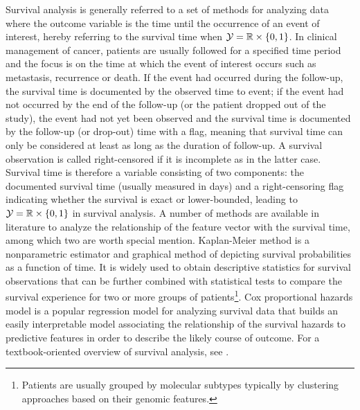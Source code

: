 Survival analysis is generally referred to a set of methods for analyzing data where the outcome variable is the time until the occurrence of an event of interest, hereby referring to the survival time when $\mathcal{Y} = \mathbb{R} \times \{0,1\}$. In clinical management of cancer, patients are usually followed for a specified time period and the focus is on the time at which the event of interest occurs such as metastasis, recurrence or death. If the event had occurred during the follow-up, the survival time is documented by the observed time to event; if the event had not occurred by the end of the follow-up (or the patient dropped out of the study), the event had not yet been observed and the survival time is documented by the follow-up (or drop-out) time with a flag, meaning that survival time can only be considered at least as long as the duration of follow-up. A survival observation is called right-censored if it is incomplete as in the latter case. Survival time is therefore a variable consisting of two components: the documented survival time (usually measured in days) and a right-censoring flag indicating whether the survival is exact or lower-bounded, leading to $\mathcal{Y} = \mathbb{R} \times \{0,1\}$ in survival analysis. A number of methods are available in literature to analyze the relationship of the feature vector with the survival time, among which two are worth special mention. Kaplan-Meier method \cite{Kaplan1958Nonparametric} is a nonparametric estimator and graphical method of depicting survival probabilities as a function of time. It is widely used to obtain descriptive statistics for survival observations that can be further combined with statistical tests to compare the survival experience for two or more groups of patients\footnote{Patients are usually grouped by molecular subtypes typically by clustering approaches based on their genomic features.}. Cox proportional hazards model \cite{Cox1972Regression} is a popular regression model for analyzing survival data that builds an easily interpretable model associating the relationship of the survival hazards to predictive features in order to describe the likely course of outcome. For a textbook-oriented overview of survival analysis, see \cite{Hosmer1999Applied}.


